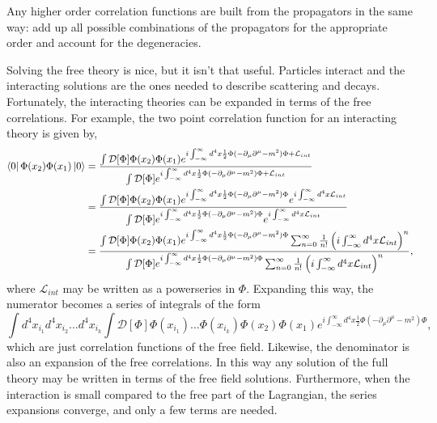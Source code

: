 Any higher order correlation functions are built from the propagators in the same way: add up all possible combinations of the propagators for the appropriate order and account for the degeneracies.  

Solving the free theory is nice, but it isn't that useful. Particles interact and the interacting solutions are the ones needed to describe scattering and decays. Fortunately, the interacting theories can be expanded in terms of the free correlations. For example, the two point correlation function for an interacting theory is given by,
\begin{equation}
\begin{split}
\bra{0}\Phi(x_2)\Phi(x_1)\ket{0} &= 
\frac{\int \mathcal{D}[\Phi]\Phi(x_2)\Phi(x_1)e^{i\int_{-\infty}^{\infty} d^4x \frac{1}{2}\Phi (-\partial_\mu\partial^\mu - m^2)\Phi + \mathcal{L}_{int}}}
{\int \mathcal{D}[\Phi]e^{i\int_{-\infty}^{\infty} d^4x \frac{1}{2}\Phi (-\partial_\mu\partial^\mu - m^2)\Phi + \mathcal{L}_{int}}} \\
&= \frac{\int \mathcal{D}[\Phi]\Phi(x_2)\Phi(x_1)
e^{i\int_{-\infty}^{\infty} d^4x \frac{1}{2}\Phi (-\partial_\mu\partial^\mu - m^2)\Phi} e^{i\int_{-\infty}^{\infty} d^4x \mathcal{L}_{int}}}
{\int \mathcal{D}[\Phi]e^{i\int_{-\infty}^{\infty} d^4x \frac{1}{2}\Phi (-\partial_\mu\partial^\mu - m^2)\Phi}  e^{i\int_{-\infty}^{\infty} d^4x \mathcal{L}_{int}}} \\
&= \frac{\int \mathcal{D}[\Phi]\Phi(x_2)\Phi(x_1)
e^{i\int_{-\infty}^{\infty} d^4x \frac{1}{2}\Phi (-\partial_\mu\partial^\mu - m^2)\Phi} \sum_{n=0}^{\infty} \frac{1}{n!}\left(i\int_{-\infty}^{\infty} d^4x \mathcal{L}_{int}\right)^n}
{\int \mathcal{D}[\Phi]e^{i\int_{-\infty}^{\infty} d^4x \frac{1}{2}\Phi (-\partial_\mu\partial^\mu - m^2)\Phi} \sum_{n=0}^{\infty} \frac{1}{n!}\left(i\int_{-\infty}^{\infty} d^4x \mathcal{L}_{int}\right)^n }, \\
\end{split}
\end{equation}
where $\mathcal{L}_{int}$ may be written as a powerseries in $\Phi$. Expanding this way, the numerator becomes a series of integrals of the form
\begin{equation}
\int d^4x_{i_1}d^4x_{i_2} ... d^4x_{i_k} \int \mathcal{D}[\Phi]\Phi(x_{i_1})...\Phi(x_{i_k})\Phi(x_2)\Phi(x_1)e^{i\int_{-\infty}^{\infty} d^4x \frac{1}{2}\Phi (-\partial_\mu\partial^\mu - m^2)\Phi},
\end{equation} 
which are just correlation functions of the free field. Likewise, the denominator is also an expansion of the free correlations. In this way any solution of the full theory may be written in terms of the free field solutions. Furthermore, when the interaction is small compared to the free part of the Lagrangian, the series expansions converge, and only a few terms are needed.   

